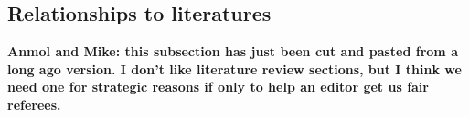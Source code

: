 \documentclass[thmsb,11pt]{article}
\begin{document}






\subsection{Relationships to literatures}
\textbf{Anmol and Mike: this subsection has just been cut and pasted from a long ago version. I don't like literature review sections, but
I think we need one for strategic reasons if only to help an editor get us fair referees.}
\end{document}
